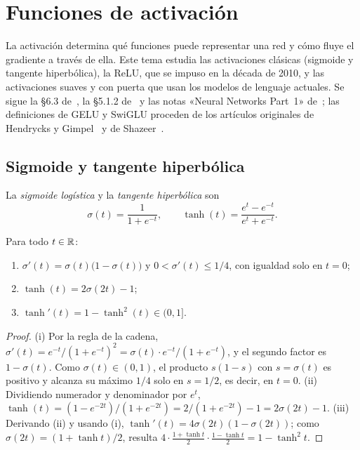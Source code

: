\chapter{Funciones de activación}
\label{tema:2}

La activación determina qué funciones puede representar una red y cómo fluye el gradiente a través de ella. Este tema estudia las activaciones clásicas (sigmoide y tangente hiperbólica), la ReLU, que se impuso en la década de 2010, y las activaciones suaves y con puerta que usan los modelos de lenguaje actuales. Se sigue la §6.3 de~\cite{gbc}, la §5.1.2 de~\cite{d2l} y las notas «Neural Networks Part~1» de~\cite{cs231n}; las definiciones de GELU y SwiGLU proceden de los artículos originales de Hendrycks y Gimpel~\cite{hendrycks} y de Shazeer~\cite{shazeer}.

\section{Sigmoide y tangente hiperbólica}

\begin{definicion}
La \emph{sigmoide logística} y la \emph{tangente hiperbólica} son
\[
\sigma(t)=\frac{1}{1+e^{-t}},\qquad \tanh(t)=\frac{e^{t}-e^{-t}}{e^{t}+e^{-t}}.
\]
\end{definicion}

\begin{proposicion}\label{prop:sigmoide}
Para todo $t\in\mathbb{R}$:
\begin{enumerate}
  \item $\sigma'(t)=\sigma(t)\bigl(1-\sigma(t)\bigr)$ y $0<\sigma'(t)\le 1/4$, con igualdad solo en $t=0$;
  \item $\tanh(t)=2\sigma(2t)-1$;
  \item $\tanh'(t)=1-\tanh^{2}(t)\in(0,1]$.
\end{enumerate}
\end{proposicion}

\begin{proof}
(i) Por la regla de la cadena, $\sigma'(t)=e^{-t}/(1+e^{-t})^{2}=\sigma(t)\cdot e^{-t}/(1+e^{-t})$, y el segundo factor es $1-\sigma(t)$. Como $\sigma(t)\in(0,1)$, el producto $s(1-s)$ con $s=\sigma(t)$ es positivo y alcanza su máximo $1/4$ solo en $s=1/2$, es decir, en $t=0$. (ii) Dividiendo numerador y denominador por $e^{t}$, $\tanh(t)=(1-e^{-2t})/(1+e^{-2t})=2/(1+e^{-2t})-1=2\sigma(2t)-1$. (iii) Derivando (ii) y usando (i), $\tanh'(t)=4\sigma(2t)(1-\sigma(2t))$; como $\sigma(2t)=(1+\tanh t)/2$, resulta $4\cdot\frac{1+\tanh t}{2}\cdot\frac{1-\tanh t}{2}=1-\tanh^{2}t$.
\end{proof}

